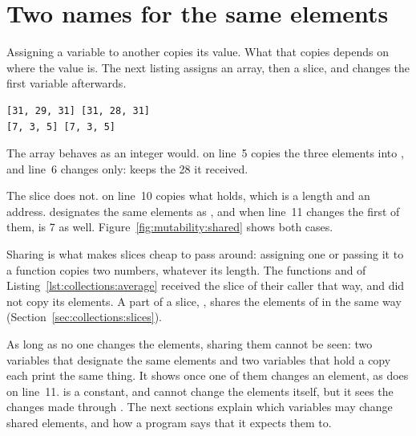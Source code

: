 \vfill\pagebreak
\section{Two names for the same elements}
\label{sec:mutability:sharing}

Assigning a variable to another copies its value. What that copies depends on
where the value is. The next listing assigns an array, then a slice, and
changes the first variable afterwards.


\vspace{-10pt}%
\begin{lstlisting}[style=bashVerb]
[31, 29, 31] [31, 28, 31]
[7, 3, 5] [7, 3, 5]
\end{lstlisting}

The array behaves as an integer would.  on line~5
copies the three elements into , and line~6 changes
 only:  keeps the 28 it received.

The slice does not.  on line~10 copies what
 holds, which is a length and an address.  designates
the same elements as , and when line~11 changes the first of them,
 is 7 as well. Figure~\ref{fig:mutability:shared} shows both
cases.



Sharing is what makes slices cheap to pass around: assigning one or passing it
to a function copies two numbers, whatever its length. The functions
 and  of Listing~\ref{lst:collections:average}
received the slice of their caller that way, and did not copy its elements. A
part of a slice, , shares the elements of  in the same
way (Section~\ref{sec:collections:slices}).

As long as no one changes the elements, sharing them cannot be seen: two
variables that designate the same elements \token{[2, 3, 5]} and two variables
that hold a copy each print the same thing. It shows once one of them changes
an element, as  does on line~11.  is a constant, and
cannot change the elements itself, but it sees the changes made through
. The next sections explain which variables may change shared
elements, and how a program says that it expects them to.

